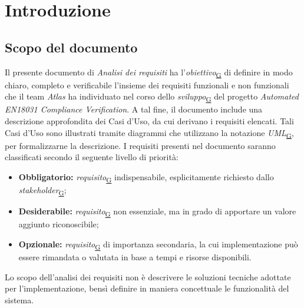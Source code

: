 ﻿\documentclass[a4paper,12pt]{article}
\begin{document}
\section{Introduzione}{
  \subsection{Scopo del documento}{
      Il presente documento di \textit{Analisi dei requisiti} ha l'\textit{obiettivo}\textsubscript{\href{https://atlasteam9.github.io/Atlas/glossario.html\#Obiettivo}{G}} di definire in modo chiaro, completo e verificabile l'insieme dei requisiti funzionali e non funzionali che il team \textit{Atlas} ha individuato nel corso dello \textit{sviluppo}\textsubscript{\href{https://atlasteam9.github.io/Atlas/glossario.html\#Sviluppo}{G}} del progetto \textit{Automated EN18031 Compliance Verification}.
      \newline
      A tal fine, il documento include una descrizione approfondita dei Casi d'Uso, da cui derivano i requisiti elencati. Tali Casi d'Uso sono illustrati tramite diagrammi che utilizzano la notazione \textit{UML}\textsubscript{\href{https://atlasteam9.github.io/Atlas/glossario.html\#UML}{G}}, per formalizzarne la descrizione.
      \newline
      I requisiti presenti nel documento saranno classificati secondo il seguente livello di priorità:
      \begin{itemize}
          \item \textbf{Obbligatorio:} \textit{requisito}\textsubscript{\href{https://atlasteam9.github.io/Atlas/glossario.html\#Requisito}{G}} indispensabile, esplicitamente richiesto dallo \textit{stakeholder}\textsubscript{\href{https://atlasteam9.github.io/Atlas/glossario.html\#Stakeholder}{G}};
          \item \textbf{Desiderabile:} \textit{requisito}\textsubscript{\href{https://atlasteam9.github.io/Atlas/glossario.html\#Requisito}{G}} non essenziale, ma in grado di apportare un valore aggiunto riconoscibile;
          \item \textbf{Opzionale:} \textit{requisito}\textsubscript{\href{https://atlasteam9.github.io/Atlas/glossario.html\#Requisito}{G}} di importanza secondaria, la cui implementazione può essere rimandata o valutata in base a tempi e risorse disponibili.
      \end{itemize}
      Lo scopo dell'analisi dei requisiti non è descrivere le soluzioni tecniche adottate per l'implementazione, bensì definire in maniera concettuale le funzionalità del sistema.
}}
\end{document}
